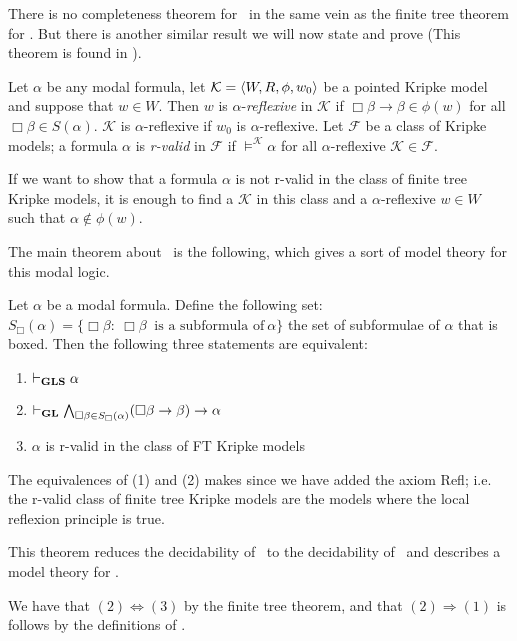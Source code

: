 \documentclass[../main.tex]{subfiles}
\begin{document}
There is no completeness theorem for \GLS\ in the same vein as the finite tree
theorem for \GL. But there is another similar result we will now state and
prove (This theorem is found in \parencite{Lind1997}).
\begin{defi}
	Let $\alpha$ be any modal formula, let $\mathcal{K}=\langle
W,R,\phi,w_0\rangle$ be a pointed Kripke model and suppose that $w\in W$.
Then $w$ is $\alpha$-\textit{reflexive} in $\mathcal{K}$ if
$\Box\beta\rightarrow\beta\in\phi(w)$ for all $\Box\beta\in S(\alpha)$.
$\mathcal{K}$ is $\alpha$-reflexive if $w_0$ is $\alpha$-reflexive. Let
$\mathcal{F}$ be a class of Kripke models; a formula $\alpha$ is
\textit{r-valid} in $\mathcal{F}$ if $\vDash^\mathcal{K}\alpha$ for all
$\alpha$-reflexive $\mathcal{K}\in\mathcal{F}$.
\end{defi}

If we want to show that a formula $\alpha$ is not r-valid in the class of
finite tree Kripke models, it is enough to find a $\mathcal{K}$ in this class
and a $\alpha$-reflexive $w\in W$ such that $\alpha\not\in\phi(w)$.

The main theorem about \GLS\ is the following, which gives a sort of
model theory for this modal logic. 

\begin{thm}
	\label{thm:MainGLS}
	Let $\alpha$ be a modal formula. Define the following set: $S_\Box(\alpha)=\{\Box\beta:\
	\Box\beta\ \text{ is a subformula of}\ \alpha\}$ the set of
	subformulae of $\alpha$ that is boxed. Then the following three
	statements are equivalent:
	\begin{enumerate}
		\item $\vdash_{\text{\textbf{GLS}}}\alpha$
		\item $\vdash_{\text{\textbf{GL}}}\bigwedge_{\Box\beta\in
			S_\Box(\alpha)}(\Box\beta\rightarrow\beta)\rightarrow\alpha$
		\item $\alpha$ is r-valid in the class of FT Kripke
			models
	\end{enumerate}
\end{thm}
The equivalences of (1) and (2) makes since we have added the axiom Refl; i.e.
the r-valid class of finite tree Kripke models are the models where the local
reflexion principle is true.

This theorem reduces the decidability of \GLS\ to the decidability of \GL\ and
describes a model theory for \GLS.

	We have that $(2)\Leftrightarrow(3)$ by the finite tree theorem, and
	that $(2)\Rightarrow(1)$ is follows by the definitions of \GLS.
\end{document}
